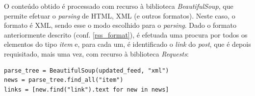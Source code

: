\documentclass{article}
\begin{document}
O conteúdo obtido é processado com recurso à biblioteca \textit{BeautifulSoup}, que permite efetuar o \textit{parsing} de HTML, XML (e outros formatos). 
Neste caso, o formato é XML, sendo esse o modo escolhido para o \textit{parsing}.
Dado o formato anteriormente descrito (conf. \ref{rss_format}), é efetuada uma procura por todos os elementos do tipo \textit{item} e, para cada um, é
identificado o \textit{link} do \textit{post}, que é depois requisitado, mais uma vez, com recurso à biblioteca \textit{Requests}:

\begin{verbatim}
parse_tree = BeautifulSoup(updated_feed, "xml")
news = parse_tree.find_all("item")
links = [new.find("link").text for new in news]
\end{verbatim}
\end{document}
